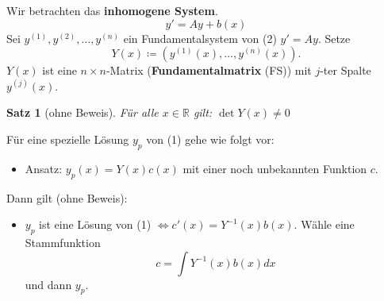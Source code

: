 \documentclass[12pt]{extreport} %
\newcommand{\R}{\mathbb{R}}
\theoremstyle{named}
\theoremstyle{nnamed}
\theoremstyle{itshape}
\newtheorem{satz}[unnamedtheorem]{Satz}
\theoremstyle{normal}
\begin{document}
Wir betrachten das \textbf{inhomogene System}.
\begin{equation*}
	y' = A y + b(x) \tag*{(1)}
\end{equation*}
Sei $y^{(1)}, y^{(2)}, \dotsc, y^{(n)}$ ein Fundamentalsystem von (2) $y' = Ay$. Setze
$$ Y(x) \coloneqq \left( y^{(1)}(x), \dotsc, y^{(n)}(x) \right). $$
$Y(x)$ ist eine $n \times n$-Matrix (\textbf{Fundamentalmatrix} (FS)) mit $j$-ter Spalte $y^{(j)}(x)$.

\begin{satz}[ohne Beweis] \label{22.2:satz}
	Für alle $x \in \R$ gilt: $\det Y(x) \neq 0$ 
\end{satz}

Für eine spezielle Lösung $y_{p}$ von (1) gehe wie folgt vor:

\begin{itemize}
	\item Ansatz: $y_{p}(x) = Y(x) c(x)$ mit einer noch unbekannten Funktion $c$. 
\end{itemize}
Dann gilt (ohne Beweis):
\begin{itemize}
	\item $y_{p}$ ist eine Lösung von (1) $\iff c'(x) = Y^{-1}(x) b(x)$. Wähle eine Stammfunktion 
		$$ c = \int Y^{-1}(x) b(x) dx $$
		 und dann $y_{p}$.
\end{itemize}
\end{document}
